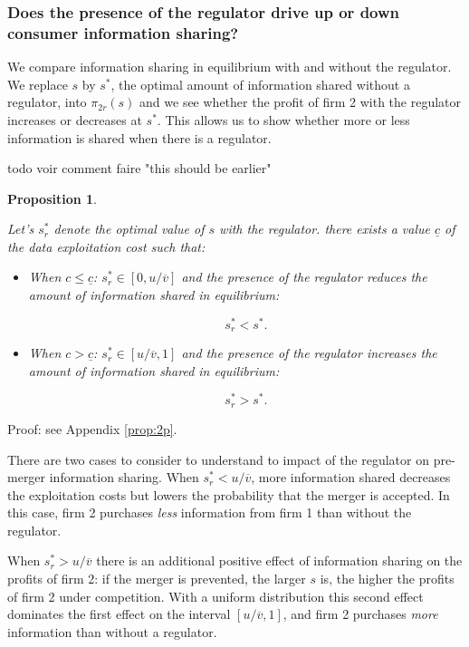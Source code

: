 \documentclass[a4paper,leqno]{article}%
\newtheorem{prop}{Proposition}
\newcommand{\ov}{\overline{v}}
\begin{document}
\medskip

\subsubsection{Does the presence of the regulator drive up or down consumer information sharing?}

We compare information sharing in equilibrium with and without the regulator. We replace $s$ by $s^*$, the optimal amount of information shared without a regulator, into $\pi_{2r}(s)$ and we see whether the profit of firm 2 with the regulator increases or decreases  at $s^*$. This allows us to show whether more or less information is shared when there is a regulator. 

todo voir comment faire "this should be earlier"

\begin{prop}~~\label{prop:2}

Let's $s_r^*$ denote the optimal value of $s$ with the regulator. there exists a value $\underline{c}$ of the data exploitation cost such that:

\begin{itemize}
    \item When $c\leq\underline{c}$: $s_r^*\in[0,u/\ov]$ and the presence of the regulator reduces the amount  of information shared in equilibrium:
    
    $$s_r^*<s^*.$$
    \item When $c>\underline{c}$: $s_r^*\in[u/\ov,1]$ and the presence of the regulator increases the amount of information shared in equilibrium:
    
    $$s_r^*>s^*.$$
\end{itemize}

\end{prop}

\noindent Proof: see Appendix \ref{prop:2p}.


\noindent There are two cases to consider to understand to impact of the regulator on pre-merger information sharing. When $s_r^* < u/ \ov$, more information shared decreases the exploitation costs but lowers the probability that the merger is accepted. In this case, firm 2 purchases \textit{less} information from firm 1 than without the regulator. 

\medskip

When $s_r^*> u/ \ov$ there is an additional positive effect of information sharing on the profits of firm 2: if the merger is prevented, the larger $s$ is, the higher the profits of firm 2 under competition. With a uniform distribution this second effect dominates the first effect on the interval $[u/\ov,1]$, and firm 2 purchases \textit{more} information than without a regulator. 
\end{document}
